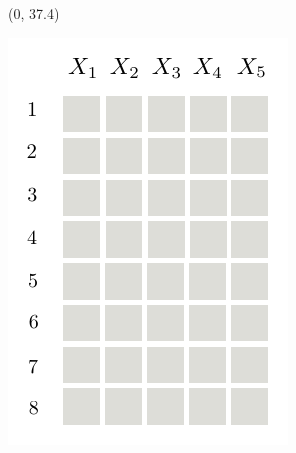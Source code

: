 \documentclass[final]{beamer}
\begin{document}
\begin{frame}{}
\begin{textblock}{25.2}
 
  \end{textblock}
  
  
  \begin{textblock}{60}(0, 37.4)
    \small
    \begin{minipage}[t][][t]{5.103cm}
      \includegraphics[width=\linewidth]{figures/grid-0}
    \end{minipage}\hspace{30pt}\begin{minipage}[t]{4.4874cm}

\end{minipage}
\end{textblock}
\end{frame}
\end{document}
